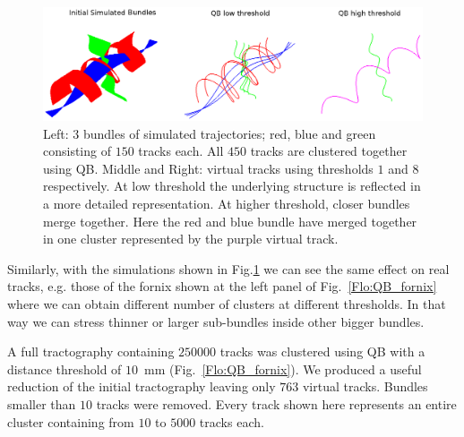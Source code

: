 \documentclass{bioinfo}
\begin{document}
\begin{figure}
\begin{centering}
\includegraphics[scale=0.5]{Figures/Fig_5_helix_phantom}
\par\end{centering}
\caption{Left: $3$ bundles of simulated trajectories; red, blue and
  green consisting of $150$ tracks each. All $450$ tracks are clustered
  together using QB. Middle and Right: virtual tracks using thresholds
  $1$ and $8$ respectively.  At low threshold the underlying structure
  is reflected in a more detailed representation. At higher threshold,
  closer bundles merge together. Here the red and blue bundle have
  merged together in one cluster represented by the purple virtual
  track.\label{Flo:simulated_orbits}}
\end{figure}

Similarly, with the simulations shown in Fig.\ref{Flo:simulated_orbits}
we can see the same effect on real tracks, e.g. those of the fornix
shown at the left panel of Fig.~\ref{Flo:QB_fornix} where we can obtain
different number of clusters at different thresholds. In that way we can
stress thinner or larger sub-bundles inside other bigger bundles. 

A full tractography containing $\num{250000}$ tracks was clustered using QB
with a distance threshold of $10$~mm (Fig.~\ref{Flo:QB_fornix}).  We
produced a useful reduction of the initial tractography leaving only
$763$ virtual tracks. Bundles smaller than $10$ tracks were
removed. Every track shown here represents an entire cluster containing
from $10$ to $\num{5000}$ tracks each.
\end{document}

